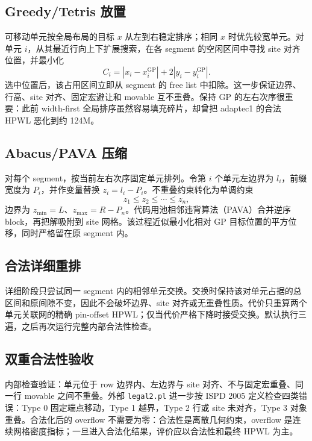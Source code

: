 \documentclass[UTF8,a4paper,11pt]{ctexart}
\begin{document}
\subsection{Greedy/Tetris 放置}

可移动单元按全局布局的目标 \(x\) 从左到右稳定排序；相同 \(x\) 时优先较宽单元。对单元 \(i\)，从其最近行向上下扩展搜索，在各 segment 的空闲区间中寻找 site 对齐位置，并最小化
\begin{equation}
  C_i=|x_i-x_i^{\mathrm{GP}}|+2|y_i-y_i^{\mathrm{GP}}|.
\end{equation}
选中位置后，该占用区间立即从 segment 的 free list 中扣除。这一步保证边界、行高、site 对齐、固定宏避让和 movable 互不重叠。保持 GP 的左右次序很重要：此前 width-first 全局排序虽然容易填充碎片，却曾把 adaptec1 的合法 HPWL 恶化到约 124M。

\subsection{Abacus/PAVA 压缩}

对每个 segment，按当前左右次序固定单元排列。令第 \(i\) 个单元左边界为 \(l_i\)，前缀宽度为 \(P_i\)，并作变量替换 \(z_i=l_i-P_i\)。不重叠约束转化为单调约束
\begin{equation}
  z_1\le z_2\le\cdots\le z_n,
\end{equation}
边界为 \(z_{\min}=L\)、\(z_{\max}=R-P_n\)。代码用池相邻违背算法（PAVA）合并逆序 block，再把解吸附到 site 网格。该过程近似最小化相对 GP 目标位置的平方位移，同时严格留在原 segment 内。

\subsection{合法详细重排}

详细阶段只尝试同一 segment 内的相邻单元交换。交换时保持该对单元占据的总区间和原间隙不变，因此不会破坏边界、site 对齐或无重叠性质。代价只重算两个单元关联网的精确 pin-offset HPWL；仅当代价严格下降时接受交换。默认执行三遍，之后再次运行完整内部合法性检查。

\subsection{双重合法性验收}

内部检查验证：单元位于 row 边界内、左边界与 site 对齐、不与固定宏重叠、同一行 movable 之间不重叠。外部 \texttt{legal2.pl} 进一步按 ISPD 2005 定义检查四类错误：Type 0 固定端点移动，Type 1 越界，Type 2 行或 site 未对齐，Type 3 对象重叠。合法化后的 overflow 不需要为零：合法性是离散几何约束，overflow 是连续网格密度指标；一旦进入合法化结果，评价应以合法性和最终 HPWL 为主。
\end{document}
